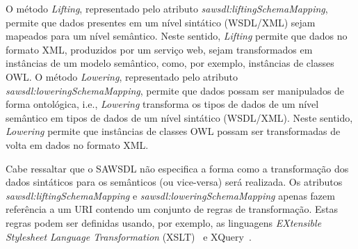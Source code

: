 O método \textit{Lifting}, representado pelo atributo \textit{sawsdl:liftingSchemaMapping}, permite que dados presentes em um nível sintático (WSDL/XML) sejam mapeados para um nível semântico. Neste sentido, \textit{Lifting} permite que dados no formato XML, produzidos por um serviço web, sejam transformados em instâncias de um modelo semântico, como, por exemplo, instâncias de classes OWL. O método \textit{Lowering}, representado pelo atributo \textit{sawsdl:loweringSchemaMapping}, permite que dados possam ser manipulados de forma ontológica, i.e., \textit{Lowering} transforma os tipos de dados de um nível semântico em tipos de dados de um nível sintático (WSDL/XML). Neste sentido, \textit{Lowering} permite que instâncias de classes OWL possam ser transformadas de volta em dados no formato XML.

Cabe ressaltar que o SAWSDL não especifica a forma como a transformação dos dados sintáticos para os semânticos (ou vice-versa) será realizada. Os atributos \textit{sawsdl:liftingSchemaMapping} e \textit{sawsdl:loweringSchemaMapping} apenas fazem referência a um URI contendo um conjunto de regras de transformação. Estas regras podem ser definidas usando, por exemplo, as linguagens \textit{EXtensible Stylesheet Language Transformation} (XSLT)~\cite{W3C-1999-XSLT} e XQuery~\cite{W3C-2017-XQuery}.